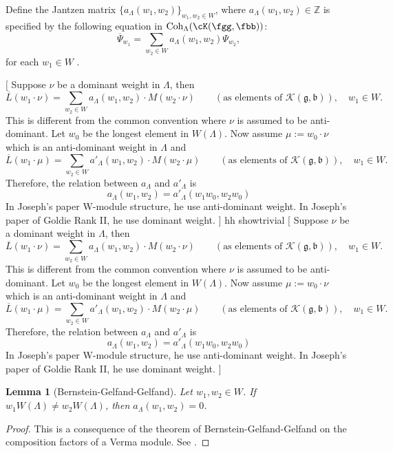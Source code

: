 \documentclass[12pt]{amsart}
\newcommand{\trivial}[2][]{\if\relax\detokenize{#1}\relax
  {%
      \color{orange} \vspace{0em}$[$#2$]$
      \color{black}
  }
  \else
\ifx#1h
\ifcsname showtrivial\endcsname
{%
    \color{orange}\vspace{0em}$[$#2$]$
    \color{black}
}
\fi
\else {\red Wrong argument!} \fi
\fi
}
\newcommand{\CK}{{\mathcal {K}}}
\newcommand{\g}{\mathfrak g}
\renewcommand{\b}{\mathfrak b}
\newcommand{\Z}{\mathbb{Z}}
\numberwithin{equation}{section}
\newtheorem{lem}[thm]{Lemma}
\theoremstyle{remark}
\def\Coh{\mathrm{Coh}}
\begin{document}
Define the Jantzen matrix $\{a_{\Lambda}(w_1, w_2)\}_{w_1, w_2\in W}$, where $a_{\Lambda}(w_1, w_2)\in \Z$ is specified by
the following equation in $\Coh_{\Lambda}(\cK(\fgg,\fbb))$:
\[
  \overline{\Psi}_{w_1}=\sum_{w_2\in W}  a_{\Lambda}(w_1, w_2)\Psi_{w_2},
\]
for each  $w_1\in W$ .

\trivial[h]{
Suppose $\nu$ be a dominant weight in $\Lambda$, then
\[
\overline L(w_1\cdot \nu)=\sum_{w_2\in W}  a_{\Lambda}(w_1, w_2) \cdot
M(w_2\cdot \nu) \qquad (\textrm{as elements of $\CK(\g,\b)$}), \quad w_1\in W.
\]
This is different from the common convention where $\nu$ is assumed to be anti-dominant.
Let $w_0$ be the longest element in $W(\Lambda)$.
Now assume $\mu:=w_0 \cdot \nu$ which is an anti-dominant weight in $\Lambda$ and
\[
\overline L(w_1\cdot \mu)=\sum_{w_2\in W}  a'_{\Lambda}(w_1, w_2) \cdot
M(w_2\cdot \mu) \qquad (\textrm{as elements of $\CK(\g,\b)$}), \quad w_1\in W.
\]
Therefore, the relation between $a_\Lambda$ and $a'_\Lambda$ is
\[
a_\Lambda(w_1,w_2) = a'_\Lambda(w_1w_0,w_2w_0)
\]
In Joseph's paper W-module structure, he use anti-dominant weight.
In Joseph's paper of Goldie Rank II, he use dominant weight.
%
%
}

\begin{lem}[Bernstein-Gelfand-Gelfand]\label{lem33}
 Let $w_1, w_2\in W$. If $w_1 W(\Lambda)\neq w_2 W(\Lambda)$, then $a_{\Lambda}(w_1, w_2)=0$.
\end{lem}
\begin{proof}
This is a consequence of the theorem of Bernstein-Gelfand-Gelfand on the composition factors of a Verma module.
See \cite[Corollary 5.2]{H}.
\end{proof}
\end{document}
